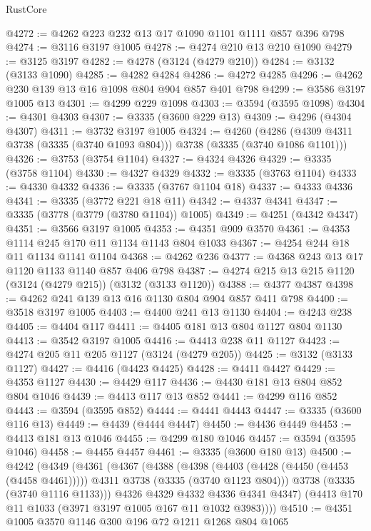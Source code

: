 \begin{lexlean}{RustCore}
\begin{coremodule}
@4272 := @4262 @223 @232 @13 @17 @1090 @1101 @1111 @857 @396 @798
@4274 := @3116 @3197 @1005
@4278 := @4274 @210 @13 @210 @1090
@4279 := @3125 @3197
@4282 := @4278 (@3124 (@4279 @210))
@4284 := @3132 (@3133 @1090)
@4285 := @4282 @4284
@4286 := @4272 @4285
@4296 := @4262 @230 @139 @13 @16 @1098 @804 @904 @857 @401 @798
@4299 := @3586 @3197 @1005 @13
@4301 := @4299 @229 @1098
@4303 := @3594 (@3595 @1098)
@4304 := @4301 @4303
@4307 := @3335 (@3600 @229 @13)
@4309 := @4296 (@4304 @4307)
@4311 := @3732 @3197 @1005
@4324 := @4260
    (@4286 (@4309 @4311 @3738 (@3335 (@3740 @1093 @804))) @3738 (@3335 (@3740 @1086 @1101)))
@4326 := @3753 (@3754 @1104)
@4327 := @4324 @4326
@4329 := @3335 (@3758 @1104)
@4330 := @4327 @4329
@4332 := @3335 (@3763 @1104)
@4333 := @4330 @4332
@4336 := @3335 (@3767 @1104 @18)
@4337 := @4333 @4336
@4341 := @3335 (@3772 @221 @18 @11)
@4342 := @4337 @4341
@4347 := @3335 (@3778 (@3779 (@3780 @1104)) @1005)
@4349 := @4251 (@4342 @4347)
@4351 := @3566 @3197 @1005
@4353 := @4351 @909 @3570
@4361 := @4353 @1114 @245 @170 @11 @1134 @1143 @804 @1033
@4367 := @4254 @244 @18 @11 @1134 @1141 @1104
@4368 := @4262 @236
@4377 := @4368 @243 @13 @17 @1120 @1133 @1140 @857 @406 @798
@4387 := @4274 @215 @13 @215 @1120 (@3124 (@4279 @215)) (@3132 (@3133 @1120))
@4388 := @4377 @4387
@4398 := @4262 @241 @139 @13 @16 @1130 @804 @904 @857 @411 @798
@4400 := @3518 @3197 @1005
@4403 := @4400 @241 @13 @1130
@4404 := @4243 @238
@4405 := @4404 @117
@4411 := @4405 @181 @13 @804 @1127 @804 @1130
@4413 := @3542 @3197 @1005
@4416 := @4413 @238 @11 @1127
@4423 := @4274 @205 @11 @205 @1127 (@3124 (@4279 @205))
@4425 := @3132 (@3133 @1127)
@4427 := @4416 (@4423 @4425)
@4428 := @4411 @4427
@4429 := @4353 @1127
@4430 := @4429 @117
@4436 := @4430 @181 @13 @804 @852 @804 @1046
@4439 := @4413 @117 @13 @852
@4441 := @4299 @116 @852
@4443 := @3594 (@3595 @852)
@4444 := @4441 @4443
@4447 := @3335 (@3600 @116 @13)
@4449 := @4439 (@4444 @4447)
@4450 := @4436 @4449
@4453 := @4413 @181 @13 @1046
@4455 := @4299 @180 @1046
@4457 := @3594 (@3595 @1046)
@4458 := @4455 @4457
@4461 := @3335 (@3600 @180 @13)
@4500 := @4242
    (@4349
      (@4361
        (@4367
          (@4388
            (@4398
              (@4403 (@4428 (@4450 (@4453 (@4458 @4461)))))
              @4311
              @3738
              (@3335 (@3740 @1123 @804)))
            @3738
            (@3335 (@3740 @1116 @1133)))
          @4326
          @4329
          @4332
          @4336
          @4341
          @4347)
        (@4413 @170 @11 @1033 (@3971 @3197 @1005 @167 @11 @1032 @3983))))
@4510 := @4351 @1005 @3570 @1146 @300 @196 @72 @1211 @1268 @804 @1065

\end{coremodule}
\end{lexlean}
